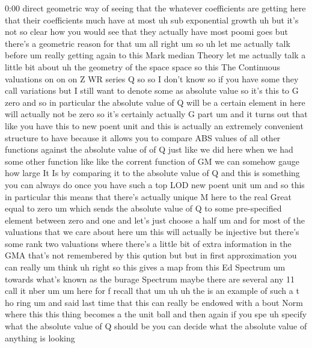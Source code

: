 \begin{unfinished}{0:00}
direct  geometric  way  of  seeing  that  the
whatever  coefficients  are  getting  here
that  their  coefficients  much  have  at
most  uh  sub  exponential  growth  uh  but
it's  not  so  clear  how  you  would  see  that
they  actually  have  most  poomi  goes  but
there's  a  geometric  reason  for
that
um  all  right
um
so  uh  let  me  actually  talk  before  um
really  getting  again  to  this  Mark  median
Theory  let  me  actually  talk  a  little  bit
about  uh  the  geometry  of  the  space
space  so  this  The  Continuous  valuations
on  on  on  Z  WR  series
Q
so  so  I  don't  know  so  if  you  have
some  they  call  variations  but  I  still
want  to  denote  some  as  absolute  value  so
it's  this  to  G
zero
and  so  in  particular  the  absolute  value
of  Q  will  be  a  certain  element  in  here
will  actually  not  be  zero  so  it's
certainly  actually  G  part
um  and  it  turns  out  that  like  you  have
this  to  new  poent  unit  and  this  is
actually  an  extremely  convenient
structure  to  have  because  it  allows  you
to  compare  ABS  values  of  all  other
functions  against  the  absolute  value  of
of  Q  just  like  we  did  here  when  we  had
some  other  function  like  like  the
corrent  function  of  GM  we  can  somehow
gauge  how  large  It  Is  by  comparing  it  to
the  absolute  value  of
Q  and  this  is  something  you  can  always
do  once  you  have  such  a  top  LOD  new
poent  unit  um  and  so  this  in  particular
this  means  that  there's  actually  unique
M  here  to  the  real  Great  equal  to  zero
um  which  sends  the  absolute  value  of  Q
to  some  pre-specified  element  between
zero  and  one  and  let's  just  choose  a
half  um
and  for  most  of  the  valuations  that  we
care  about  here  um  this  will  actually  be
injective  but  there's  some  rank  two
valuations  where  there's  a  little  bit  of
extra  information  in  the  GMA  that's  not
remembered  by  this  qution  but  but  in
first  approximation  you  can  really  um
think  uh  right  so  this  gives  a
map  from  this  Ed
Spectrum
um  towards  what's  known  as  the  burage
Spectrum  maybe  there  are  several  any  11
call  it
nber
um
um  here
for
f  recall  that
um  uh  uh  the  is  an  example  of  such  a  t
ho  ring
um  and  said  last  time  that  this  can
really  be  endowed  with  a  bout  Norm  where
this  this  thing  becomes  a  the  unit  ball
and  then  again  if  you  spe  uh  specify
what  the  absolute  value  of  Q  should  be
you  can  decide  what  the  absolute  value
of  anything  is  looking

\end{unfinished}
